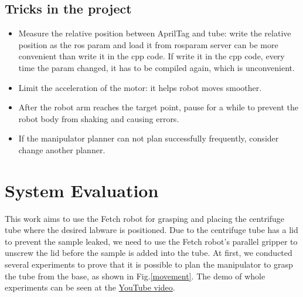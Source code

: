 \documentclass[12pt,draftclsnofoot,onecolumn]{IEEEtran}
\begin{document}
	\subsection{Tricks in the project}
		\begin{itemize}
	\item Measure the relative position between AprilTag and tube: write the relative position as the ros param and load it from rosparam server can be more convenient than write it in the cpp code. If write it in the cpp code, every time the param changed, it has to be compiled again, which is unconvenient.
	\item Limit the acceleration of the motor: it helps robot moves smoother.
	\item After the robot arm reaches the target point, pause for a while to prevent the robot body from shaking and causing errors.
	\item If the manipulator planner can not plan successfully frequently, consider change another planner.
	\end{itemize}
    
	
	\section{System Evaluation}
	This work aims to use the Fetch robot for grasping and placing the centrifuge tube where the desired labware is positioned. Due to the centrifuge tube has a lid to prevent the sample leaked, we need to use the Fetch robot's parallel gripper to unscrew the lid before the sample is added into the tube. At first, we conducted several experiments to prove that it is possible to plan the manipulator to grasp the tube from the base, as shown in Fig.\ref{movement}. The demo of whole experiments can be seen at the \href{https://youtu.be/GrqMmCn_Z8M}{YouTube video}.
	
\end{document}
